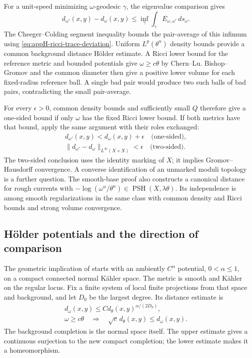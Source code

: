 For a unit-speed minimizing \(\omega\)-geodesic \(\gamma\),
the eigenvalue comparison gives
\[
 d_{\omega'}(x,y)-d_\omega(x,y)
               \leq\inf_{\gamma}\int_\gamma E_{\omega,\omega'}\,ds_\omega.
\]
The Cheeger--Colding segment inequality bounds the pair-average
of this infimum using \eqref{eq:appH-ricci-trace-deviation}.
Uniform \(L^p(\theta^n)\) density bounds provide a common
background distance Hölder estimate. A Ricci lower bound for
the reference metric and bounded potentials give
\(\omega\geq c\theta\) by Chern--Lu. Bishop--Gromov and the
common diameter then give a positive lower volume for each
fixed-radius reference ball. A single bad pair would produce
two such balls of bad pairs, contradicting the small
pair-average.

For every \(\epsilon>0\), common density bounds and sufficiently
small \(Q\) therefore give a one-sided bound if only \(\omega\)
has the fixed Ricci lower bound. If both metrics have that
bound, apply the same argument with their roles exchanged:
\[
 \begin{gathered}
 d_{\omega'}(x,y)<d_\omega(x,y)+\epsilon
                 \quad\text{(one-sided)},\\
 \|d_{\omega'}-d_\omega\|_{L^\infty(X\times X)}<\epsilon
                 \quad\text{(two-sided)}.
 \end{gathered}
 \tag{H.170}\label{eq:appH-ricci-marked-stability}
\]
The two-sided conclusion uses the identity marking of \(X\);
it implies Gromov--Hausdorff convergence. A converse
identification of an unmarked moduli topology is a further
question. The smooth-base proof also constructs a canonical
distance for rough currents with
\(-\log(\omega^n/\theta^n)\in\operatorname{PSH}(X,\lambda\theta)\).
Its independence is among smooth regularizations in the same
class with common density and Ricci bounds and strong volume
convergence.

\subsection{Hölder potentials and the direction of comparison}

The geometric implication of
\cite[Proposition~1]{GSS26GeometricHolderV1}
starts with an ambiently \(C^\alpha\) potential, \(0<\alpha\leq1\),
on a compact connected normal Kähler space. The metric is smooth
and Kähler on the regular locus. Fix a finite system of local
finite projections from that space and background, and let
\(D_0\) be the largest degree. Its distance estimate is
\[
 \begin{gathered}
 d_\omega(x,y)\leq C d_\theta(x,y)^{\alpha/(2D_0)},\\
 \omega\geq c\theta\quad\Longrightarrow\quad
 \sqrt c\,d_\theta(x,y)\leq d_\omega(x,y).
 \end{gathered}
 \tag{H.171}\label{eq:appH-ricci-holder-comparison}
\]
The background completion is the normal space itself.
The upper estimate gives a continuous surjection to the new
compact completion; the lower estimate makes it a homeomorphism.

